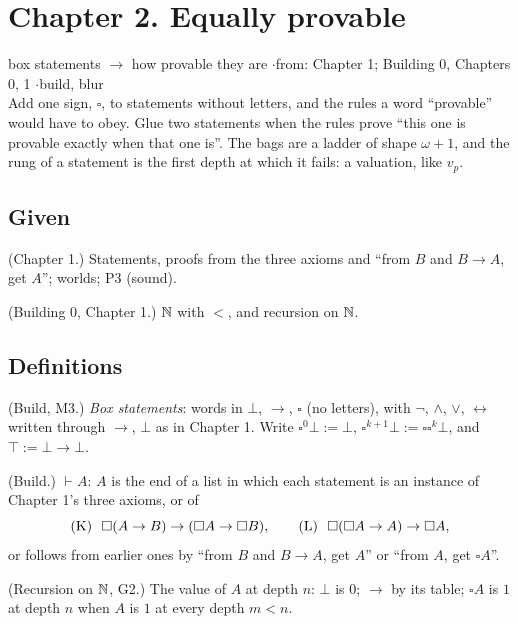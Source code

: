 \newpage

\section*{Chapter 2. Equally provable}
\begin{center}
{\normalsize box statements $\to$ how provable they are \quad$\cdot$\quad from: Chapter 1; Building 0, Chapters 0, 1 \quad$\cdot$\quad build, blur}\\[4pt]
{\small Add one sign, $\square$, to statements without letters, and the rules a word ``provable'' would have to obey. Glue two statements when the rules prove ``this one is provable exactly when that one is''. The bags are a ladder of shape $\omega + 1$, and the rung of a statement is the first depth at which it fails: a valuation, like $v_p$.}
\end{center}

\subsection*{Given}

\begin{lines}
\item[\lab{G1}] (Chapter 1.) Statements, proofs from the three axioms and ``from $B$ and $B \to A$, get $A$''; worlds; P3 (sound).
\item[\lab{G2}] (Building 0, Chapter 1.) $\mathbb{N}$ with $<$, and recursion on $\mathbb{N}$.
\end{lines}

\subsection*{Definitions}

\begin{lines}
\item[\lab{D1}] (Build, M3.) \emph{Box statements}: words in $\bot$, $\to$, $\square$ (no letters), with $\neg$, $\wedge$, $\vee$, $\leftrightarrow$ written through $\to$, $\bot$ as in Chapter 1. Write $\square^0\bot := \bot$, $\square^{k+1}\bot := \square\square^k\bot$, and $\top := \bot \to \bot$.
\item[\lab{D2}] (Build.) $\vdash A$: $A$ is the end of a list in which each statement is an instance of Chapter 1's three axioms, or of
\[ \textup{(K)}\ \ \square(A \to B) \to (\square A \to \square B), \qquad \textup{(L)}\ \ \square(\square A \to A) \to \square A, \]
or follows from earlier ones by ``from $B$ and $B \to A$, get $A$'' or ``from $A$, get $\square A$''.
\item[\lab{D3}] (Recursion on $\mathbb{N}$, G2.) The value of $A$ at depth $n$: $\bot$ is $0$; $\to$ by its table; $\square A$ is $1$ at depth $n$ when $A$ is $1$ at every depth $m < n$.
\end{lines}

